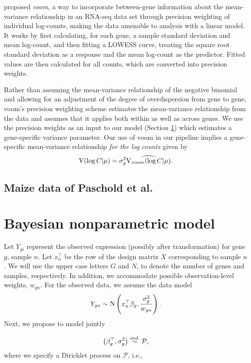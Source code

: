 \cite{voom} proposed \textit{voom}, a way to incorporate between-gene information about the mean-variance relationship in an RNA-seq data set through precision weighting of individual log-counts, making the data amenable to analysis with a linear model. It works by first calculating, for each gene, a sample standard deviation and mean log-count, and then fitting a LOWESS curve, treating the square root standard deviation as a response and the mean log-count as the predictor. Fitted values are then calculated for all counts, which are converted into precision weights.

Rather than assuming the mean-variance relationship of the negative binomial and allowing for an adjustment of the degree of overdispersion from gene to gene, voom's precision weighting scheme estimates the mean-variance relationship from the data and assumes that it applies both within as well as across genes. We use the precision weights as an input to our model (Section \ref{sec:model}) which estimates a gene-specific variance parameter. Our use of voom in our pipeline implies a gene-specific mean-variance relationship \textit{for the log counts} given by
$$\operatorname{V}(\log C|\mu)=\sigma^2_g \widehat{\operatorname{V}_{voom}(\log C|\mu)}.$$


\subsection{Maize data of Paschold et al.}


\section{Bayesian nonparametric model}
\label{sec:model}
Let $Y_{gi}$ represent the observed expression (possibly after transformation) for gene $g$, sample $n$. Let $x_{n}^\top$ be the row of the design matrix $X$ corresponding to sample $n$. We will use the upper case letters $G$ and $N$, to denote the number of genes and samples, respectively. In addition, we accommodate possible observation-level weights, $w_{gn}$. For the observed data, we assume the data model
\begin{equation}
Y_{gn} \sim \operatorname{N} \left( x_{n}^\top \beta_g, \frac{\sigma^2_g}{w_{gn}} \right).
\end{equation}
Next, we propose to model jointly

\begin{equation}
\left(\beta_g^\top,\sigma^2_g\right) \stackrel{ind.}{\sim} \mathcal{P},
\end{equation}
where we specify a Dirichlet process on $\mathcal{P}$, i.e.,


